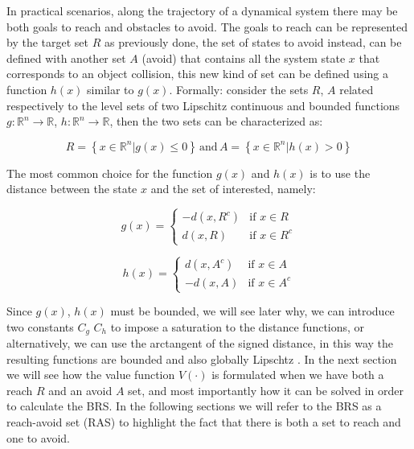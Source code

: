 In practical scenarios, along the trajectory of a dynamical system there may be both goals to reach and obstacles to avoid. The goals to reach can be represented by the target set $R$ as previously done, the set of states to avoid instead, can be defined with another set $A$ (avoid) that contains all the system state $x$ that corresponds to an object collision, this new kind of set can be defined using a function $h(x)$ similar to $g(x)$. Formally: consider the sets $R$, $A$ related respectively to the level sets of two Lipschitz continuous and bounded functions $g: \mathbb{R}^n \rightarrow \mathbb{R}$, $h: \mathbb{R}^n \rightarrow \mathbb{R}$, then the two sets can be characterized as:

\begin{equation} 
\label{R_A}
R = \left\{ x \in \mathbb{R}^n | g(x) \leq 0 \right\} \, \textrm{and} \, A = \left\{x \in \mathbb{R}^n | h(x) > 0 \right\}
\end{equation}

The most common choice for the function $g(x)$ and $h(x)$ is to use the distance between the state $x$ and the set of interested, namely:

\begin{equation}
\label{g}
    g(x) =
\left\{
	\begin{array}{ll}
		-d(x, R^c)  & \mbox{if } x \in R \\
		d(x, R) & \mbox{if } x \in R^c
	\end{array}
\right.
\end{equation}

\begin{equation}
\label{h}
    h(x) =
\left\{
	\begin{array}{ll}
		d(x, A^c)  & \mbox{if } x \in A \\
		-d(x, A) & \mbox{if } x \in A^c
	\end{array}
\right.
\end{equation}

Since $g(x)$, $h(x)$ must be bounded, we will see later why, we can introduce two constants $C_g$ $C_h$ to impose a saturation to the distance functions, or alternatively, we can use the arctangent of the signed distance, in this way the resulting functions are bounded and also globally Lipschtz \cite{reach_avoid_no_dist}. 
In the next section we will see how the value function $V(\cdot)$ is formulated when we have both a reach $R$ and an avoid $A$ set, and most importantly how it can be solved in order to calculate the BRS. In the following sections we will refer to the BRS as a reach-avoid set (RAS) to highlight the fact that there is both a set to reach and one to avoid.